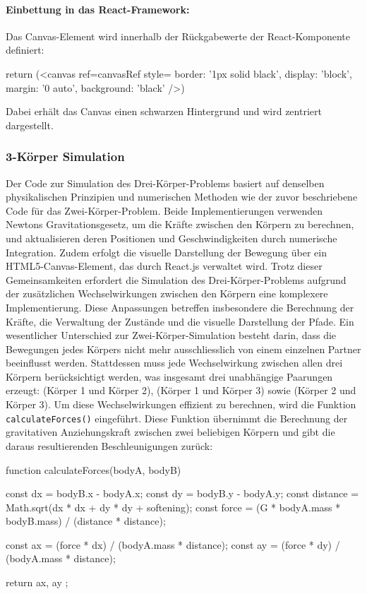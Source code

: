 \documentclass[a4paper,12pt,twoside]{article}
\begin{document}
\paragraph{Einbettung in das React-Framework:}
Das Canvas-Element wird innerhalb der Rückgabewerte der React-Komponente definiert:

\begin{javascript}
return (<canvas ref={canvasRef} style={{ border: '1px solid black', display: 'block', margin: '0 auto', background: 'black' }} />)
\end{javascript}
Dabei erhält das Canvas einen schwarzen Hintergrund und wird zentriert dargestellt.


\subsubsection{3-Körper Simulation}
Der Code zur Simulation des Drei-Körper-Problems basiert auf denselben physikalischen Prinzipien und numerischen Methoden wie der zuvor beschriebene Code für das Zwei-Körper-Problem. Beide Implementierungen verwenden Newtons Gravitationsgesetz, um die Kräfte zwischen den Körpern zu berechnen, und aktualisieren deren Positionen und Geschwindigkeiten durch numerische Integration. Zudem erfolgt die visuelle Darstellung der Bewegung über ein HTML5-Canvas-Element, das durch React.js verwaltet wird. Trotz dieser Gemeinsamkeiten erfordert die Simulation des Drei-Körper-Problems aufgrund der zusätzlichen Wechselwirkungen zwischen den Körpern eine komplexere Implementierung. Diese Anpassungen betreffen insbesondere die Berechnung der Kräfte, die Verwaltung der Zustände und die visuelle Darstellung der Pfade.
Ein wesentlicher Unterschied zur Zwei-Körper-Simulation besteht darin, dass die Bewegungen jedes Körpers nicht mehr ausschliesslich von einem einzelnen Partner beeinflusst werden. Stattdessen muss jede Wechselwirkung zwischen allen drei Körpern berücksichtigt werden, was insgesamt drei unabhängige Paarungen erzeugt: (Körper 1 und Körper 2), (Körper 1 und Körper 3) sowie (Körper 2 und Körper 3). Um diese Wechselwirkungen effizient zu berechnen, wird die Funktion \texttt{calculateForces()} eingeführt. Diese Funktion übernimmt die Berechnung der gravitativen Anziehungskraft zwischen zwei beliebigen Körpern und gibt die daraus resultierenden Beschleunigungen zurück:

\begin{javascript}
function calculateForces(bodyA, bodyB) {
    const dx = bodyB.x - bodyA.x;
    const dy = bodyB.y - bodyA.y;
    const distance = Math.sqrt(dx * dx + dy * dy + softening);
    const force = (G * bodyA.mass * bodyB.mass) / (distance * distance);

    const ax = (force * dx) / (bodyA.mass * distance);
    const ay = (force * dy) / (bodyA.mass * distance);

    return { ax, ay };
}
\end{javascript}
\end{document}
